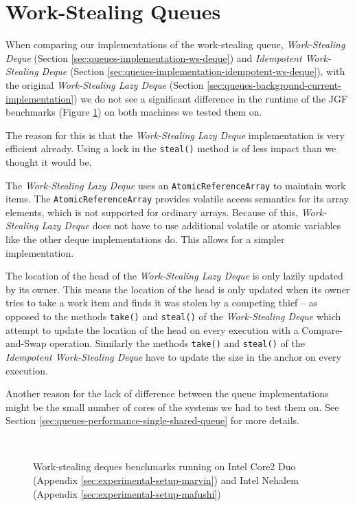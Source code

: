 \section{Work-Stealing Queues}
\label{sec:queues-performance-ws}

When comparing our implementations of the work-stealing queue,
\emph{Work-Stealing Deque} (Section
\ref{sec:queues-implementation-ws-deque}) and \emph{Idempotent
  Work-Stealing Deque} (Section
\ref{sec:queues-implementation-idempotent-ws-deque}), with the
original \emph{Work-Stealing Lazy Deque} (Section
\ref{sec:queues-background-current-implementation}) we do not see a
significant difference in the runtime of the JGF benchmarks (Figure
\ref{fig:queues-performance-deques}) on both machines we tested them
on.

The reason for this is that the \emph{Work-Stealing Lazy Deque}
implementation is very efficient already. Using a lock in the
\lstinline!steal()! method is of less impact than we thought it would
be.

The \emph{Work-Stealing Lazy Deque} uses an
\lstinline!AtomicReferenceArray! to maintain work items. The
\lstinline!AtomicReferenceArray! provides volatile access semantics
for its array elements, which is not supported for ordinary
arrays. Because of this, \emph{Work-Stealing Lazy Deque} does not have
to use additional volatile or atomic variables like the other deque
implementations do. This allows for a simpler implementation.

The location of the head of the \emph{Work-Stealing Lazy Deque} is
only lazily updated by its owner. This means the location of the head
is only updated when its owner tries to take a work item and finds it
was stolen by a competing thief -- as opposed to the methods
\lstinline!take()! and \lstinline!steal()!  of the \emph{Work-Stealing
  Deque} which attempt to update the location of the head on every
execution with a Compare-and-Swap operation. Similarly the methods
\lstinline!take()!  and \lstinline!steal()! of the \emph{Idempotent
  Work-Stealing Deque} have to update the size in the anchor on every
execution.

Another reason for the lack of difference between the queue
implementations might be the small number of cores of the systems we
had to test them on. See Section
\ref{sec:queues-performance-single-shared-queue} for more details.

\begin{figure}[!ht]
  \centering
  \\
  \caption[Work-stealing deques benchmark results]{Work-stealing
    deques benchmarks running on Intel Core2 Duo (Appendix
    \ref{sec:experimental-setup-marvin}) and Intel Nehalem (Appendix
    \ref{sec:experimental-setup-mafushi})}
  \label{fig:queues-performance-deques}
\end{figure}


